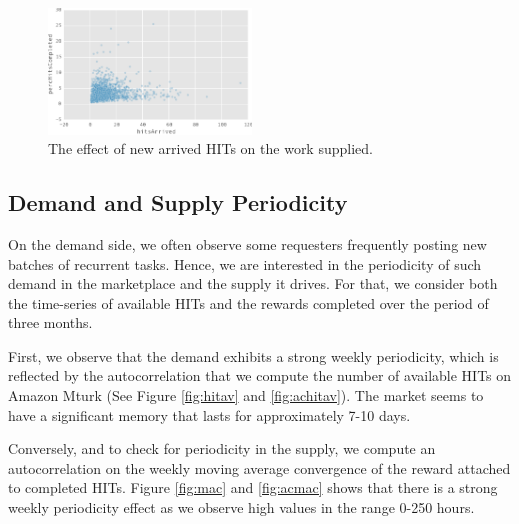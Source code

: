 \begin{figure}[tb]
	\centering
		\includegraphics[width=0.48\textwidth]{figures/percHitsCompleted.pdf}
	\caption{The effect of new arrived HITs on the work  supplied.}
	\label{fig:perc_hits_completed}
\end{figure}

\subsection{Demand and Supply Periodicity}
On the demand side, we often observe some requesters frequently posting new batches of recurrent tasks. Hence, we are interested in the periodicity of such demand in the marketplace and the supply it drives. For that, we consider both the time-series of available HITs and the rewards completed over the period of three months. 

First, we observe that the demand exhibits a strong weekly periodicity, which is reflected by the autocorrelation that we compute the number of available HITs on Amazon Mturk (See Figure \ref{fig:hitav} and \ref{fig:achitav}). The market seems to have a significant memory that lasts for approximately 7-10 days.

Conversely, and to check for periodicity in the supply, we compute an autocorrelation on the weekly moving average convergence of the reward attached to completed HITs. Figure \ref{fig:mac} and \ref{fig:acmac} shows that there is a strong weekly periodicity effect as we observe high values in the range 0-250 hours.

